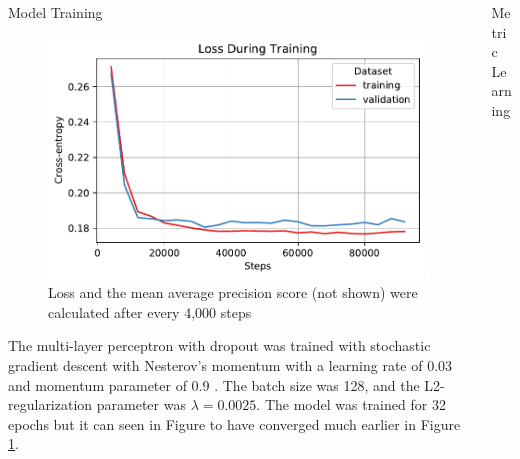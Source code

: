 \documentclass[final]{beamer}
\newlength{\onecolwid}
\newlength{\twocolwid}
\begin{document}
\begin{frame}[t]
\begin{columns}[t]
\begin{column}{\twocolwid}
\begin{columns}[t,totalwidth=\twocolwid]
\begin{column}{\onecolwid}
\begin{block}{Model Training}
      \begin{figure}
        \centering
        \includegraphics[scale=1.5]{../project/object_detection/training_loss.pdf}
        \caption{Loss and the mean average precision score (not shown) were
          calculated after every 4,000 steps}
        \label{fig:training_loss}
      \end{figure}

      The multi-layer perceptron with dropout was trained with stochastic
      gradient descent with Nesterov's momentum with a learning rate of 0.03 and
      momentum parameter of 0.9 \citep{momentum}. The batch size was 128, and
      the L2-regularization parameter was $\lambda = 0.0025$. The model was
      trained for 32 epochs but it can seen in Figure to have converged much
      earlier in Figure \ref{fig:training_loss}.
\end{block}


\end{column} %

\begin{column}{\onecolwid} %

\begin{block}{Metric Learning}


\end{block}
\end{column}
\end{columns}
\end{column}
\end{columns}
\end{frame}
\end{document}
